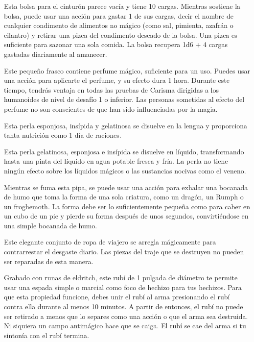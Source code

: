 \documentclass[a4paper,twocolumn,openany,10pt]{dndbook}
\begin{document}
Esta bolsa para el cinturón parece vacía y tiene 10 cargas. Mientras sostiene la bolsa, puede usar una acción para gastar 1 de
sus cargas, decir el nombre de cualquier condimento de alimentos no mágico (como sal, pimienta, azafrán o cilantro) y retirar
una pizca del condimento deseado de la bolsa. Una pizca es suficiente para sazonar una sola comida. La bolsa recupera 1d6 + 4
cargas gastadas diariamente al amanecer. 

Este pequeño frasco contiene perfume mágico, suficiente para un uso. Puedes usar una acción para aplicarte el perfume, y su
efecto dura 1 hora. Durante este tiempo, tendrás ventaja en todas las pruebas de Carisma dirigidas a los humanoides de nivel de
desafío 1 o inferior. Las personas sometidas al efecto del perfume no son conscientes de que han sido influenciadas por la magia.

Esta perla esponjosa, insípida y gelatinosa se disuelve en la lengua y proporciona tanta nutrición como 1 día de raciones. 

Esta perla gelatinosa, esponjosa e insípida se disuelve en líquido, transformando hasta una pinta del líquido en agua potable
fresca y fría. La perla no tiene ningún efecto sobre los líquidos mágicos o las sustancias nocivas como el veneno. 

Mientras se fuma esta pipa, se puede usar una acción para exhalar una bocanada de humo que toma la forma de una sola criatura,
como un dragón, un Rumph o un froghemoth. La forma debe ser lo suficientemente pequeña como para caber en un cubo de un pie y
pierde su forma después de unos segundos, convirtiéndose en una simple bocanada de humo. 

Este elegante conjunto de ropa de viajero se arregla mágicamente para contrarrestar el desgaste diario. Las piezas del traje que
se destruyen no pueden ser reparadas de esta manera.

Grabado con runas de eldritch, este rubí de 1 pulgada de diámetro te permite usar una espada simple o marcial como foco de
hechizo para tus hechizos. Para que esta propiedad funcione, debes unir el rubí al arma presionando el rubí contra ella durante
al menos 10 minutos. A partir de entonces, el rubí no puede ser retirado a menos que lo separes como una acción o que el arma
sea destruida. Ni siquiera un campo antimágico hace que se caiga. El rubí se cae del arma si tu sintonía con el rubí termina. 
\end{document}
